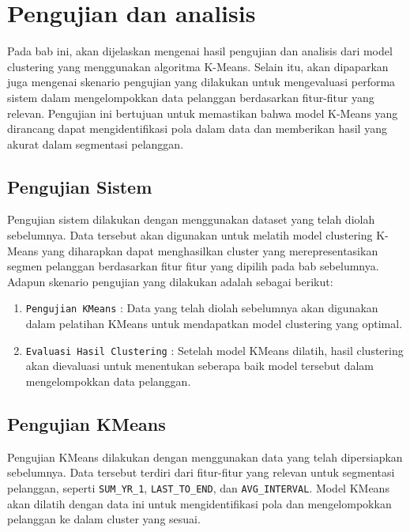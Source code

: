 \newpage

\section{Pengujian dan analisis}
Pada bab ini, akan dijelaskan mengenai hasil pengujian dan analisis dari model clustering yang menggunakan algoritma K-Means. Selain itu, akan dipaparkan juga mengenai skenario pengujian yang dilakukan untuk mengevaluasi performa sistem dalam mengelompokkan data pelanggan berdasarkan fitur-fitur yang relevan. Pengujian ini bertujuan untuk memastikan bahwa model K-Means yang dirancang dapat mengidentifikasi pola dalam data dan memberikan hasil yang akurat dalam segmentasi pelanggan.

\subsection{Pengujian Sistem}

Pengujian sistem dilakukan dengan menggunakan dataset yang telah diolah sebelumnya. Data tersebut akan digunakan untuk melatih model clustering K-Means yang diharapkan dapat menghasilkan cluster yang merepresentasikan segmen pelanggan berdasarkan fitur fitur yang dipilih pada bab sebelumnya. Adapun skenario pengujian yang dilakukan adalah sebagai berikut:

\begin{enumerate}
    \item \texttt{Pengujian KMeans} : Data yang telah diolah sebelumnya akan digunakan dalam pelatihan KMeans untuk mendapatkan model clustering yang optimal.
    \item \texttt{Evaluasi Hasil Clustering} : Setelah model KMeans dilatih, hasil clustering akan dievaluasi untuk menentukan seberapa baik model tersebut dalam mengelompokkan data pelanggan.
\end{enumerate}

\subsection{Pengujian KMeans}

Pengujian KMeans dilakukan dengan menggunakan data yang telah dipersiapkan sebelumnya. Data tersebut terdiri dari fitur-fitur yang relevan untuk segmentasi pelanggan, seperti \texttt{SUM\_YR\_1}, \texttt{LAST\_TO\_END}, dan \texttt{AVG\_INTERVAL}. Model KMeans akan dilatih dengan data ini untuk mengidentifikasi pola dan mengelompokkan pelanggan ke dalam cluster yang sesuai.

